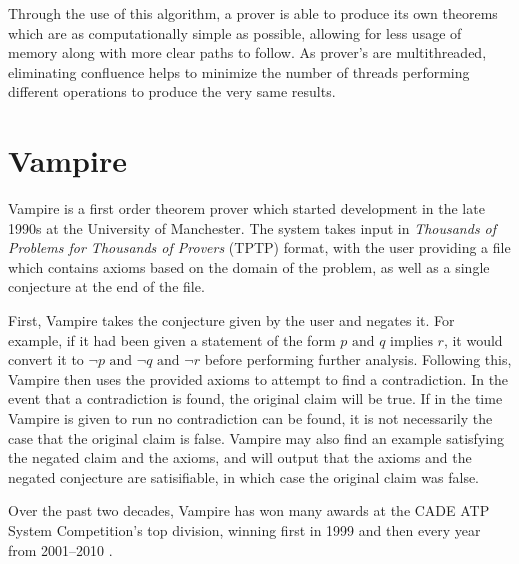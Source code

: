 Through the use of this algorithm, a prover is able to produce its own theorems which are as computationally simple as possible, allowing for less usage of memory along with more clear paths to follow. As prover's are multithreaded, eliminating confluence helps to minimize the number of threads performing different operations to produce the very same results.

\section{Vampire}

Vampire is a first order theorem prover which started development in the late 1990s at the University of Manchester. The system takes input in \textit{Thousands of Problems for Thousands of Provers} (TPTP) format, with the user providing a file which contains axioms based on the domain of the problem, as well as a single conjecture at the end of the file.

First, Vampire takes the conjecture given by the user and negates it. For example, if it had been given a statement of the form $p \text{ and } q \text{ implies } r$, it would convert it to $\neg p \text{ and } \neg q \text{ and } \neg r$ before performing further analysis. Following this, Vampire then uses the provided axioms to attempt to find a contradiction. In the event that a contradiction is found, the original claim will be true. If in the time Vampire is given to run no contradiction can be found, it is not necessarily the case that the original claim is false. Vampire may also find an example satisfying the negated claim and the axioms, and will output that the axioms and the negated conjecture are satisifiable, in which case the original claim was false.

Over the past two decades, Vampire has won many awards at the CADE ATP System Competition's top division, winning first in 1999 and then every year from 2001--2010 \cite{cade}.

